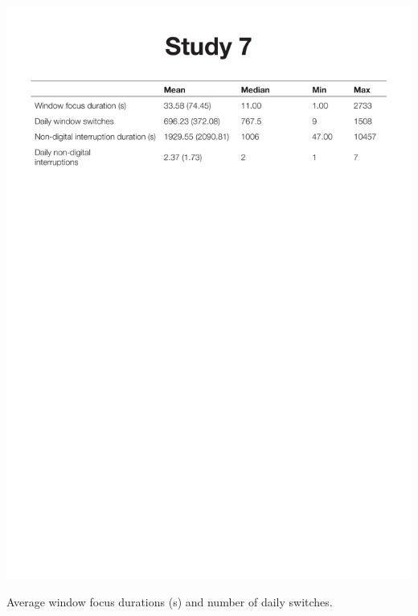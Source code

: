 \begin{table}
\centering
\centerline{\includegraphics[scale=0.7]{images/ch56/ch56_7_Means.pdf}}
\caption[Study 7 window switching behaviour]{Average window focus durations (s) and number of daily switches.}
\label{tbl:ch56-7_manictimedata}
\end{table}

